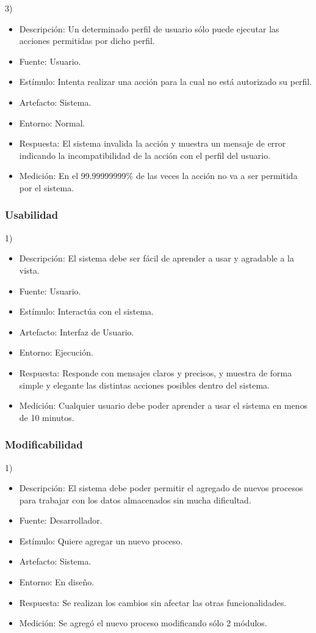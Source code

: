 \documentclass{article}
\theoremstyle{definition}
\theoremstyle{remark}
\begin{document}
3)
\begin{itemize}
  \item Descripción: Un determinado perfil de usuario sólo puede ejecutar las acciones permitidas por dicho perfil.
  \item Fuente: Usuario. %
  \item Estímulo: Intenta realizar una acción para la cual no está autorizado su perfil.
  \item Artefacto: Sistema.
  \item Entorno: Normal.
  \item Respuesta: El sistema invalida la acción y muestra un mensaje de error indicando la incompatibilidad de la acción con el perfil del usuario.
  \item Medición: En el 99.99999999\% de las veces la acción no va a ser permitida por el sistema.
\end{itemize}

\subsubsection{Usabilidad}
1)
\begin{itemize}
  \item Descripción: El sistema debe ser fácil de aprender a usar y agradable a la vista.
  \item Fuente: Usuario.
  \item Estímulo: Interactúa con el sistema.
  \item Artefacto: Interfaz de Usuario.
  \item Entorno: Ejecución.
  \item Respuesta: Responde con mensajes claros y precisos, y muestra de forma simple y elegante las distintas acciones posibles dentro del sistema.
  \item Medición: Cualquier usuario debe poder aprender a usar el sistema en menos de 10 minutos.
\end{itemize}

\subsubsection{Modificabilidad}
1)
\begin{itemize}
  \item Descripción: El sistema debe poder permitir el agregado de nuevos procesos para trabajar con los datos almacenados sin mucha dificultad.
  \item Fuente: Desarrollador.
  \item Estímulo: Quiere agregar un nuevo proceso.
  \item Artefacto: Sistema.
  \item Entorno: En diseño.
  \item Respuesta: Se realizan los cambios sin afectar las otras funcionalidades.
  \item Medición: Se agregó el nuevo proceso modificando sólo 2 módulos.
\end{itemize}
\end{document}
